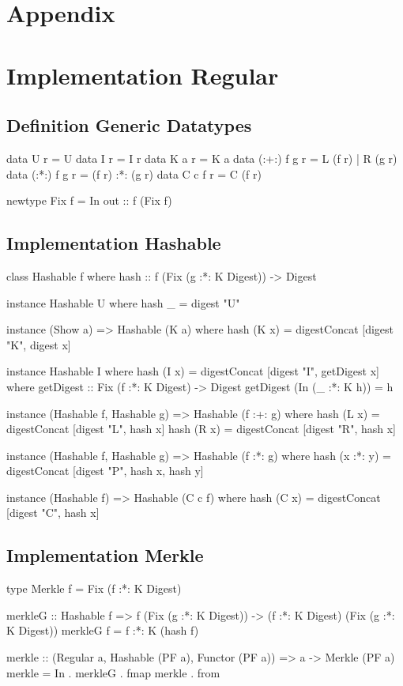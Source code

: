 \section{Appendix}
\appendix

\section{Implementation Regular}

\subsection{Definition Generic Datatypes}
\label{app-def-generic-datatypes}
\begin{haskell}
data U r         = U
data I r         = I r                  
data K a r       = K a                  
data (:+:) f g r = L (f r) | R (g r)
data (:*:) f g r = (f r) :*: (g r) 
data C c f r     = C (f r)

newtype Fix f = In { out :: f (Fix f) }
\end{haskell}

\subsection{Implementation Hashable}
\label{app-impl-hashable}
\begin{haskell}
class Hashable f where
  hash :: f (Fix (g :*: K Digest)) -> Digest

instance Hashable U where
  hash _ = digest "U"

instance (Show a) => Hashable (K a) where
  hash (K x) = digestConcat [digest "K", digest x]

instance Hashable I where
  hash (I x) = digestConcat [digest "I", getDigest x]
    where
      getDigest :: Fix (f :*: K Digest) -> Digest
      getDigest (In (_ :*: K h)) = h

instance (Hashable f, Hashable g) => Hashable (f :+: g) where
  hash (L x) = digestConcat [digest "L", hash x]
  hash (R x) = digestConcat [digest "R", hash x]

instance (Hashable f, Hashable g) => Hashable (f :*: g) where
  hash (x :*: y) = digestConcat [digest "P", hash x, hash y]

instance (Hashable f) => Hashable (C c f) where
  hash (C x) = digestConcat [digest "C", hash x]
\end{haskell}

\subsection{Implementation Merkle}
\label{app-impl-merkle}
\begin{haskell}
type Merkle f = Fix (f :*: K Digest)

merkleG :: Hashable f 
        => f (Fix (g :*: K Digest)) 
        -> (f :*: K Digest) (Fix (g :*: K Digest))
merkleG f = f :*: K (hash f)

merkle :: (Regular a, Hashable (PF a), Functor (PF a)) 
       => a -> Merkle (PF a)
merkle = In . merkleG . fmap merkle . from
\end{haskell}

